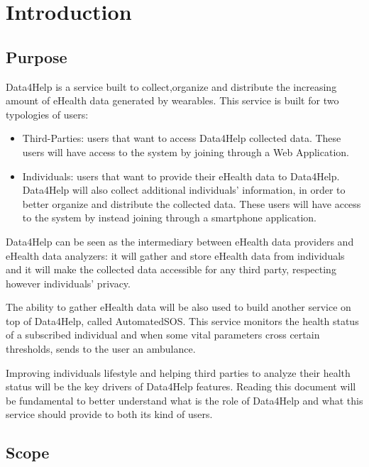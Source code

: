 
\chapter{Introduction}
\section{Purpose}
Data4Help is a service built to collect,organize and distribute the increasing amount of eHealth data generated by wearables.
\givespace
This service is built for two typologies of users:
\begin{itemize}
\item Third-Parties: users that want to access Data4Help collected data. These users will have access to the system by joining through a Web Application.
\item Individuals: users that want to provide their eHealth data to Data4Help. Data4Help will also collect additional individuals' information, in order to better organize and distribute the collected data.
These users will have access to the system by instead joining through a smartphone application.
\end{itemize}
Data4Help can be seen as the intermediary between eHealth data providers and eHealth data analyzers: it will gather  and store eHealth data from individuals and it will make the collected data accessible for any third party, respecting however individuals' privacy.
\givespace

The ability to gather eHealth data will be also used to build another service on top of Data4Help, called AutomatedSOS.
This service monitors the health status of a subscribed individual and when some vital parameters cross certain thresholds, sends to the user an ambulance.
\givespace

Improving individuals lifestyle and helping third parties to analyze their health status will be the key drivers of Data4Help features.
\givespace
Reading this document will be fundamental to better understand what is the role of Data4Help and what this service should provide to both its kind of users.





\section{Scope}
